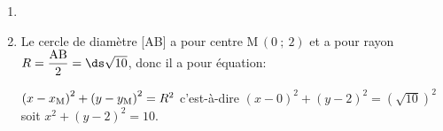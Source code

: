 \begin{enumerate}
$\begin{gathered}\left \lbrace
\begin{array}{r !{=} l}
x+3y-6 & 0\\
-3x+y+2 & 0
\end{array}
\right .
\iff
\left \lbrace
\begin{array}{r !{=} ll}
3x+9y-18 & 0 & (L_1 \gets 3L_1)\\
-3x+y+2 & 0
\end{array}
\right .\\
\hspace*{1cm}
\iff
\left \lbrace
\begin{array}{r !{=} ll}
x & -3y+6\\
10y-16 & 0 & (L_2 \gets L_1+L_2)
\end{array}
\right .
\iff
\left \lbrace
\begin{array}{r !{=} l}
x & 1,2\\
y& 1,6
\end{array}
\right .\end{gathered}$

Donc le point K a pour coordonnées $(1,2~;~1,6)$.

\item 
{}

\item Le cercle de diamètre [AB] a pour centre M\,$(0~;~2)$ et a pour rayon $R=\dfrac{\text{AB}}{2}=\ds\sqrt{10}$, donc il a pour équation:

$\left ( x-x_{\text M}\right )^2 + \left ( y-y_{\text M} \right )^2 = R^2$
c'est-à-dire 
$\left (x - 0 \right )^2 + \left ( y-2 \right )^2 =  \left (\sqrt{10}\right )^2$
soit
$x^2 + \left (y-2\right )^2=10$.
\end{enumerate}

